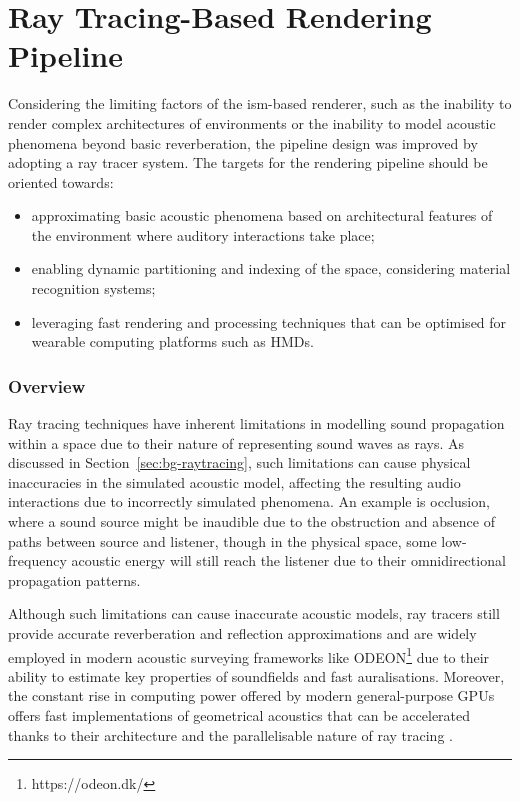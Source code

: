 \section{Ray Tracing-Based Rendering Pipeline}\label{sec:ga-based-pipeline}
Considering the limiting factors of the \acrshort{ism}-based renderer, such as the inability to render complex architectures of environments or the inability to model acoustic phenomena beyond basic reverberation, the pipeline design was improved by adopting a ray tracer system. The targets for the rendering pipeline should be oriented towards: 
\begin{itemize}
    \item approximating basic acoustic phenomena based on architectural features of the environment where auditory interactions take place;
    \item enabling dynamic partitioning and indexing of the space, considering material recognition systems; 
    \item leveraging fast rendering and processing techniques that can be optimised for wearable computing platforms such as HMDs.
\end{itemize}

\subsubsection{Overview}
Ray tracing techniques have inherent limitations in modelling sound propagation within a space due to their nature of representing sound waves as rays. As discussed in Section~\ref{sec:bg-raytracing}, such limitations can cause physical inaccuracies in the simulated acoustic model, affecting the resulting audio interactions due to incorrectly simulated phenomena. An example is occlusion, where a sound source might be inaudible due to the obstruction and absence of paths between source and listener, though in the physical space, some low-frequency acoustic energy will still reach the listener due to their omnidirectional propagation patterns. \par
Although such limitations can cause inaccurate acoustic models, ray tracers still provide accurate reverberation and reflection approximations and are widely employed in modern acoustic surveying frameworks like ODEON\footnote{https://odeon.dk/} due to their ability to estimate key properties of soundfields and fast auralisations. Moreover, the constant rise in computing power offered by modern general-purpose GPUs offers fast implementations of geometrical acoustics that can be accelerated thanks to their architecture and the parallelisable nature of ray tracing \citep{savioja2010use}.\par

